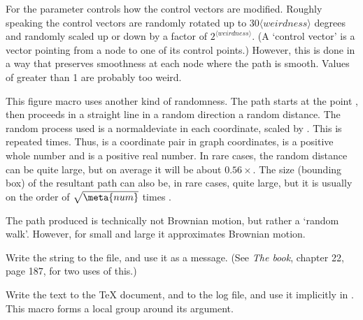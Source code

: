 \documentclass[letterpaper]{article}
\begin{document}
For  the  parameter controls how the
control vectors are modified. Roughly speaking the control vectors are
randomly rotated up to $30\langle\mathit{weirdness}\rangle$ degrees and
randomly scaled up or down by a factor of
$2^{\langle\mathit{weirdness}\rangle}$. (A `control vector' is a vector
pointing from a node to one of its control points.) However, this is
done in a way that preserves smoothness at each node where the path is
smooth. Values of  greater than 1 are probably too
weird.

\begin{cd}
%
\end{cd}

This figure macro uses another kind of randomness. The path starts at
the point , then proceeds in a straight line in a random
direction a random distance. The random process used is a normaldeviate
in each coordinate, scaled by . This is repeated 
times. Thus,  is a coordinate pair in graph coordinates,
 is a positive whole number and  is a positive
real number. In rare cases, the random distance can be quite large, but
on average it will be about $0.56\times{}$. The size
(bounding box) of the resultant path can also be, in rare cases,
quite large, but it is usually on the order of $\sqrt{\meta{num}}$ times
.

The path produced is technically not Brownian motion, but rather a
`random walk'. However, for small  and large  it
approximates Brownian motion.

\begin{cd}
%
\end{cd}

Write the string  to the \MF{} file, and use it as a \MF{}
message. (See \textit{The \MF{}book}, chapter 22, page 187, for two uses of
this.)

\begin{cd}
%
\end{cd}

Write the text  to the \TeX{} document, and to the log file,
and use it implicitly in . This macro forms a local group
around its argument.
\end{document}

